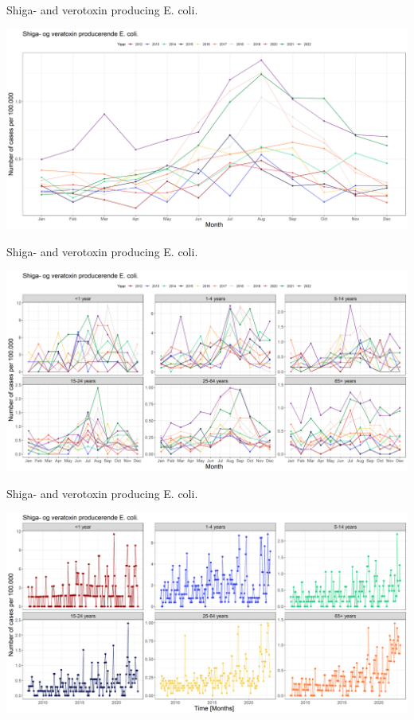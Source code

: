 \documentclass[aspectratio=169]{beamer}
\begin{document}
\begin{frame}{Shiga- and verotoxin producing E. coli.}
\protect\hypertarget{shiga--and-verotoxin-producing-e.-coli.-1}{}
\tiny

\includegraphics[width=1\linewidth]{../figures/EpixSTEC}

\normalsize
\end{frame}

\begin{frame}{Shiga- and verotoxin producing E. coli.}
\protect\hypertarget{shiga--and-verotoxin-producing-e.-coli.-2}{}
\tiny

\includegraphics[width=1\linewidth]{../figures/STECxEpixAgeGroup}

\normalsize
\end{frame}

\begin{frame}{Shiga- and verotoxin producing E. coli.}
\protect\hypertarget{shiga--and-verotoxin-producing-e.-coli.-3}{}
\tiny

\includegraphics[width=1\linewidth]{../figures/ShigaogveratoxinproducerendeEcolixAgeGroup}

\normalsize
\end{frame}
\end{document}
